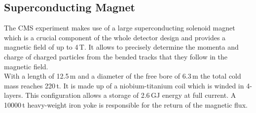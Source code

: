 \subsection{Superconducting Magnet}
\label{subsec:cms_magnet}
The CMS experiment makes use of a large superconducting solenoid magnet which is a crucial component of the whole detector design and provides a magnetic field of up to 4\,T. It allows to precisely determine the momenta and charge of charged particles from the bended tracks that they follow in the magnetic field.\\
With a length of 12.5\,m and a diameter of the free bore of 6.3\,m the total cold mass reaches 220\,t. It is made up of a niobium-titanium coil which is winded in 4-layers. This configuration allows a storage of 2.6\,GJ energy at full current. A 10000\,t heavy-weight iron yoke is responsible for the return of the magnetic flux.

